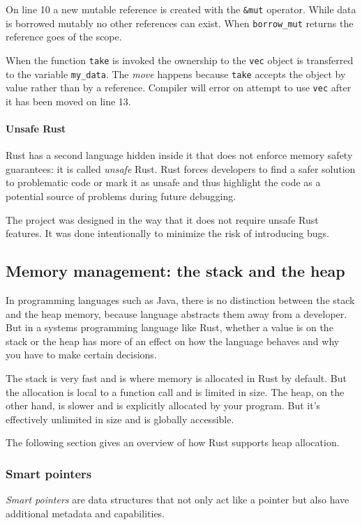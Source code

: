 On line 10 a new mutable reference is created with the \texttt{&mut} operator. While data is borrowed mutably no other references can exist. When \texttt{borrow_mut} returns the reference goes of the scope.

When the function \texttt{take} is invoked the ownership to the \texttt{vec} object is transferred to the variable \texttt{my_data}. The \emph{move} happens because \texttt{take} accepts the object by value rather than by a reference. Compiler will error on attempt to use \texttt{vec} after it has been moved on line 13.

\paragraph{Unsafe Rust}
Rust has a second language hidden inside it that does not enforce memory safety guarantees: it is called \emph{unsafe} Rust. Rust forces developers to find a safer solution to problematic code or mark it as unsafe and thus highlight the code as a potential source of problems during future debugging.

The \pvecrs{} project was designed in the way that it does not require unsafe Rust features. It was done intentionally to minimize the risk of introducing bugs.

\subsection{Memory management: the stack and the heap}
In programming languages such as Java, there is no distinction between the stack and the heap memory, because language abstracts them away from a developer. But in a systems programming language like Rust, whether a value is on the stack or the heap has more of an effect on how the language behaves and why you have to make certain decisions.

The stack is very fast and is where memory is allocated in Rust by default. But the allocation is local to a function call and is limited in size. The heap, on the other hand, is slower and is explicitly allocated by your program. But it’s effectively unlimited in size and is globally accessible.

The following section gives an overview of how Rust supports heap allocation.

\subsubsection*{Smart pointers}
\emph{Smart pointers} are data structures that not only act like a pointer but also have additional metadata and capabilities.

